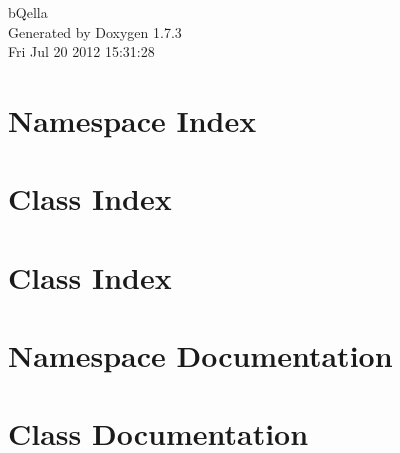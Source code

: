 \documentclass[a4paper]{book}
\begin{document}
\hypersetup{pageanchor=false}
\begin{titlepage}
\vspace*{7cm}
\begin{center}
{\Large bQella }\\
\vspace*{1cm}
{\large Generated by Doxygen 1.7.3}\\
\vspace*{0.5cm}
{\small Fri Jul 20 2012 15:31:28}\\
\end{center}
\end{titlepage}
\clearemptydoublepage
{}
\tableofcontents
\clearemptydoublepage
{}
\hypersetup{pageanchor=true}
\chapter{Namespace Index}

\chapter{Class Index}

\chapter{Class Index}

\chapter{Namespace Documentation}

\chapter{Class Documentation}













































\printindex
\end{document}
